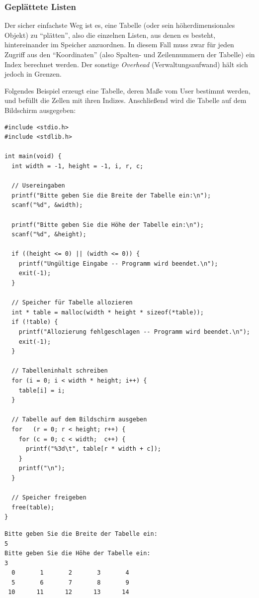 \subsubsection{Geplättete Listen}
Der sicher einfachste Weg ist es, eine Tabelle (oder sein höherdimensionales Objekt) zu \enquote{plätten}, also die einzelnen Listen, aus denen es besteht, hintereinander im Speicher anzuordnen. In diesem Fall muss zwar für jeden Zugriff aus den \enquote{Koordinaten} (also \eg Spalten- und Zeilennummern der Tabelle) ein Index berechnet werden. Der sonstige \emph{Overhead} (Verwaltungsaufwand) hält sich jedoch in Grenzen.

Folgendes Beispiel erzeugt eine Tabelle, deren Maße vom User bestimmt werden, und befüllt die Zellen mit ihren Indizes. Anschließend wird die Tabelle auf dem Bildschirm ausgegeben:

\begin{codebox}
\begin{verbatim}
#include <stdio.h>
#include <stdlib.h>
 
int main(void) {
  int width = -1, height = -1, i, r, c;
  
  // Usereingaben
  printf("Bitte geben Sie die Breite der Tabelle ein:\n");
  scanf("%d", &width);
  
  printf("Bitte geben Sie die Höhe der Tabelle ein:\n");
  scanf("%d", &height);
  
  if ((height <= 0) || (width <= 0)) {
    printf("Ungültige Eingabe -- Programm wird beendet.\n");
    exit(-1);
  }
  
  // Speicher für Tabelle allozieren
  int * table = malloc(width * height * sizeof(*table));
  if (!table) {
    printf("Allozierung fehlgeschlagen -- Programm wird beendet.\n");
    exit(-1);
  }
  
  // Tabelleninhalt schreiben
  for (i = 0; i < width * height; i++) {
    table[i] = i;
  }
  
  // Tabelle auf dem Bildschirm ausgeben
  for   (r = 0; r < height; r++) {
    for (c = 0; c < width;  c++) {
      printf("%3d\t", table[r * width + c]);
    }
    printf("\n");
  }
  
  // Speicher freigeben
  free(table);
}
\end{verbatim}
\end{codebox}

\begin{cmdbox}
\begin{verbatim}
Bitte geben Sie die Breite der Tabelle ein:
5
Bitte geben Sie die Höhe der Tabelle ein:
3
  0       1       2       3       4
  5       6       7       8       9
 10      11      12      13      14
\end{verbatim}
\end{cmdbox}

